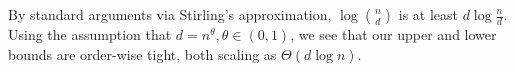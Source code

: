 \documentclass[onecolumn,letterpaper]{IEEEtran}
\newcommand{\na}{{a}}
\newcommand{\plsize}{{\chi}}
\newcommand{\mean}{{\mu}}
\newcommand{\var}{{\sigma^{2}}}
\begin{document}
\begin{IEEEproof}
By standard arguments via Stirling’s approximation, $\log \binom{n}{d}$ is at least $d\log\frac{n}{d}$. Using the assumption that $ d= n^{\theta},\theta\in(0,1)$, we see that our upper and lower bounds are order-wise tight, both scaling as $\Theta \left(d\log n\right)$.
\end{IEEEproof}
\end{document}

